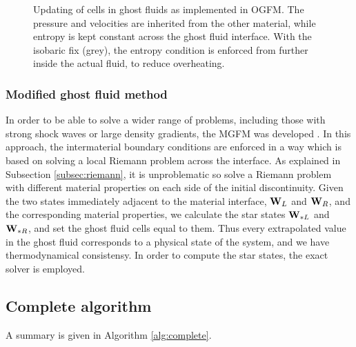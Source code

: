 \documentclass[final,3p,twocolumn]{elsarticle}
\begin{document}
\begin{figure}[htb]
    \caption{Updating of cells in ghost fluids as implemented in OGFM. The
    pressure and velocities are inherited from the other material, while
    entropy is kept constant across the ghost fluid interface. With the
    isobaric fix (grey), the entropy condition is enforced from further inside the
    actual fluid, to reduce overheating.}
    \label{fig:OGFM}
\end{figure}

\subsubsection{Modified ghost fluid method}
\label{subsubsec:mgfm}

In order to be able to solve a wider range of problems, including those with
strong shock waves or large density gradients, the MGFM was developed
\cite{liu2003ghost, sambasivan2009ghost}. In this approach, the intermaterial
boundary conditions are enforced in a way which is based on solving a local
Riemann problem across the interface. As explained in Subsection
\ref{subsec:riemann}, it is unproblematic so solve a Riemann problem with
different material properties on each side of the initial discontinuity. Given
the two states immediately adjacent to the material interface, ${\bf W}_L$ and
${\bf W}_R$, and the corresponding material properties, we calculate the star
states ${\bf W}_{*L}$ and ${\bf W}_{*R}$, and set the ghost fluid cells equal
to them. Thus every extrapolated value in the ghost fluid corresponds to a
physical state of the system, and we have thermodynamical consistensy. In order
to compute the star states, the exact solver is employed. 

\subsection{Complete algorithm}
\label{subsec:complete}

A summary is given in Algorithm \ref{alg:complete}.
\end{document}
